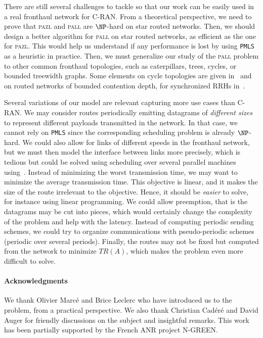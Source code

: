 \documentclass[a4paper,10pt]{journal}
\newcommand\PMLS{\texttt{PMLS}\xspace}
\newcommand\pazl{\textsc{pazl}\xspace}
\newcommand\pall{\textsc{pall}\xspace}
\begin{document}
There are still several challenges to tackle so that our work can be easily used in a real fronthaul network for C-RAN.
From a theoretical perspective, we need to prove that \pazl and \pall are $\NP$-hard on star routed networks. Then, we should design a better \FPT algorithm for \pall on star routed networks, as efficient as the one for \pazl. This would help us understand if any performance is lost by using \PMLS as a heuristic in practice. Then, we must generalize our study of the \pall problem to other common fronthaul topologies, such as caterpillars, trees, cycles, or bounded treewidth graphs. Some elements on cycle topologies are given in~\cite{DBLP:conf/ondm/BarthGS19} and on routed networks of bounded contention depth, for synchronized RRHs in~\cite{guiraud2020synchronized}.


Several variations of our model are relevant capturing more use cases than C-RAN.
We may consider routes periodically emitting datagrams of \emph{different sizes} to represent different payloads transmitted in the network. In that case, we cannot rely on \PMLS since the corresponding scheduling problem is already $\NP$-hard.
We could also allow for links of different speeds in the fronthaul network, but we must then model
the interface between links more precisely, which is tedious but could be solved using scheduling over several parallel machines using~\cite{simons1989fast}.
Instead of minimizing the worst transmission time, we may want to minimize the average transmission time. This objective is linear, and it makes the size of the route irrelevant to the objective. Hence, it should be \emph{easier} to solve, for instance using linear programming. We could allow preemption, that is the datagrams may be cut into pieces, which would certainly change the complexity of the problem and help with the latency.
Instead of computing periodic sending schemes, we could try to organize communications with pseudo-periodic schemes (periodic over several periods). Finally, the routes may not be fixed but computed from the network to minimize $TR(A)$, which makes the problem even more difficult to solve.





 	\paragraph*{Acknowledgments} 
 	We thank Olivier Marcé and Brice Leclerc who have introduced us to the problem, from a practical perspective. We also thank Christian Cad\'er\'e and David Auger for friendly discussions on the subject and insightful remarks. This work has been partially supported by the French ANR project N-GREEN.



\end{document}
